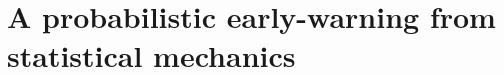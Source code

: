 \documentclass[../main.tex]{subfiles}
\begin{document}
\section{A probabilistic early-warning from statistical mechanics}\label{sec4}


\printbibliography
\end{document}
